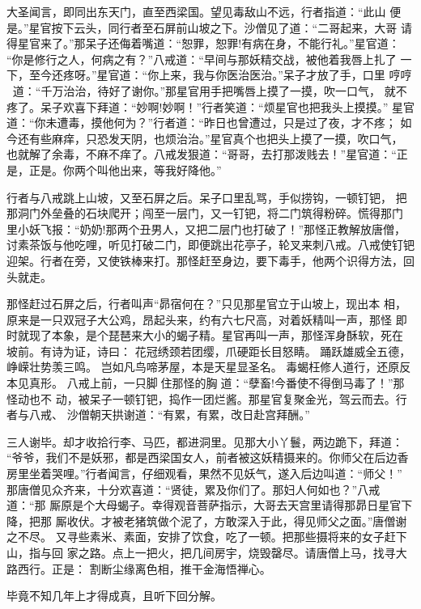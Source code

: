 大圣闻言，即同出东天门，直至西梁国。望见毒敌山不远，行者指道：“此山
便是。”星官按下云头，同行者至石屏前山坡之下。沙僧见了道：“二哥起来，大哥
请得星官来了。”那呆子还侮着嘴道：“恕罪，恕罪!有病在身，不能行礼。”星官道：
“你是修行之人，何病之有？”八戒道：“早间与那妖精交战，被他着我唇上扎了
一下，至今还疼呀。”星官道：“你上来，我与你医治医治。”呆子才放了手，口里
哼哼道：“千万治治，待好了谢你。”那星官用手把嘴唇上摸了一摸，吹一口气，
就不疼了。呆子欢喜下拜道：“妙啊!妙啊！”行者笑道：“烦星官也把我头上摸摸。”
星官道：“你未遭毒，摸他何为？”行者道：“昨日也曾遭过，只是过了夜，才不疼；
如今还有些麻痒，只恐发天阴，也烦治治。”星官真个也把头上摸了一摸，吹口气，
也就解了余毒，不麻不痒了。八戒发狠道：“哥哥，去打那泼贱去！”星官道：“正
是，正是。你两个叫他出来，等我好降他。”

行者与八戒跳上山坡，又至石屏之后。呆子口里乱骂，手似捞钩，一顿钉钯，
把那洞门外垒叠的石块爬开；闯至一层门，又一钉钯，将二门筑得粉碎。慌得那门
里小妖飞报：“奶奶!那两个丑男人，又把二层门也打破了！”那怪正教解放唐僧，
讨素茶饭与他吃哩，听见打破二门，即便跳出花亭子，轮叉来刺八戒。八戒使钉钯
迎架。行者在旁，又使铁棒来打。那怪赶至身边，要下毒手，他两个识得方法，回
头就走。

那怪赶过石屏之后，行者叫声“昴宿何在？”只见那星官立于山坡上，现出本
相，原来是一只双冠子大公鸡，昂起头来，约有六七尺高，对着妖精叫一声，那怪
即时就现了本象，是个琵琶来大小的蝎子精。星官再叫一声，那怪浑身酥软，死在
坡前。有诗为证，诗曰：
花冠绣颈若团缨，爪硬距长目怒睛。
踊跃雄威全五德，峥嵘壮势羡三鸣。
岂如凡鸟啼茅屋，本是天星显圣名。
毒蝎枉修人道行，还原反本见真形。
八戒上前，一只脚住那怪的胸道：“孽畜!今番使不得倒马毒了！”那怪动也不
动，被呆子一顿钉钯，捣作一团烂酱。那星官复聚金光，驾云而去。行者与八戒、
沙僧朝天拱谢道：“有累，有累，改日赴宫拜酬。”

三人谢毕。却才收拾行李、马匹，都进洞里。见那大小丫鬟，两边跪下，拜道：
“爷爷，我们不是妖邪，都是西梁国女人，前者被这妖精摄来的。你师父在后边香
房里坐着哭哩。”行者闻言，仔细观看，果然不见妖气，遂入后边叫道：“师父！”
那唐僧见众齐来，十分欢喜道：“贤徒，累及你们了。那妇人何如也？”八戒道：“那
厮原是个大母蝎子。幸得观音菩萨指示，大哥去天宫里请得那昴日星官下降，把那
厮收伏。才被老猪筑做个泥了，方敢深入于此，得见师父之面。”唐僧谢之不尽。
又寻些素米、素面，安排了饮食，吃了一顿。把那些摄将来的女子赶下山，指与回
家之路。点上一把火，把几间房宇，烧毁罄尽。请唐僧上马，找寻大路西行。正是：
割断尘缘离色相，推干金海悟禅心。

毕竟不知几年上才得成真，且听下回分解。